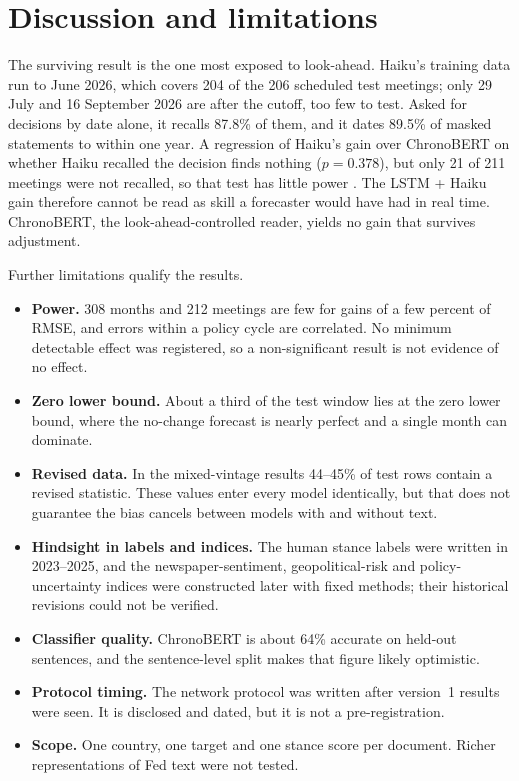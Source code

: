 \documentclass[11pt]{article}
\begin{document}
\section{Discussion and limitations}\label{sec:disc}

The surviving result is the one most exposed to look-ahead. Haiku's training data run to June 2026, which covers
204 of the 206 scheduled test meetings; only 29 July and 16 September 2026 are after the cutoff, too few to test. Asked for decisions by date alone, it recalls 87.8\% of them, and it dates 89.5\% of masked
statements to within one year. A regression of Haiku's gain over ChronoBERT on whether Haiku recalled the decision
finds nothing ($p=0.378$), but only 21 of 211 meetings were not recalled, so that test has little power
\citep[see][on why memorisation evidence is a lower bound]{lopezlira2025}. The LSTM + Haiku gain therefore cannot
be read as skill a forecaster would have had in real time. ChronoBERT, the look-ahead-controlled reader, yields no
gain that survives adjustment.

Further limitations qualify the results.
\begin{itemize}
  \item \textbf{Power.} 308 months and 212 meetings are few for gains of a few percent of RMSE, and errors within
        a policy cycle are correlated. No minimum detectable effect was registered, so a non-significant result
        is not evidence of no effect.
  \item \textbf{Zero lower bound.} About a third of the test window lies at the zero lower bound, where the
        no-change forecast is nearly perfect and a single month can dominate.
  \item \textbf{Revised data.} In the mixed-vintage results 44--45\% of test rows contain a revised statistic.
        These values enter every model identically, but that does not guarantee the bias cancels between models
        with and without text.
  \item \textbf{Hindsight in labels and indices.} The human stance labels were written in 2023--2025, and the
        newspaper-sentiment, geopolitical-risk and policy-uncertainty indices were constructed later with fixed
        methods; their historical revisions could not be verified.
  \item \textbf{Classifier quality.} ChronoBERT is about 64\% accurate on held-out sentences, and the
        sentence-level split makes that figure likely optimistic.
  \item \textbf{Protocol timing.} The network protocol was written after version~1 results were seen. It is
        disclosed and dated, but it is not a pre-registration.
  \item \textbf{Scope.} One country, one target and one stance score per document. Richer representations of
        Fed text were not tested.
\end{itemize}
\end{document}
